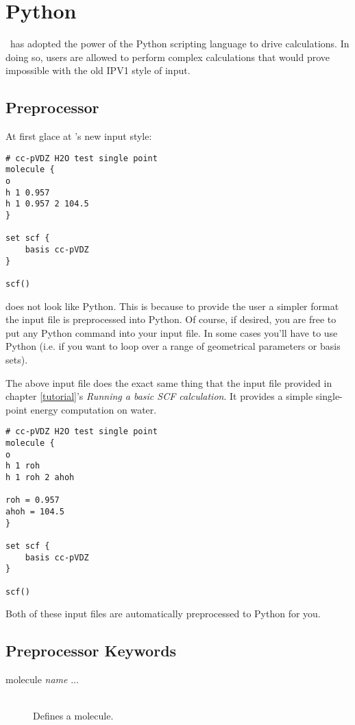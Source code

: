 \section{Python} \label{python}
\PSIfour\ has adopted the power of the Python scripting language
to drive calculations. In doing so, users are allowed to perform
complex calculations that would prove impossible with the old
IPV1 style of input.

\subsection{Preprocessor}
At first glace at \PSIfour 's new input style:
\begin{verbatim}
# cc-pVDZ H2O test single point
molecule {
o
h 1 0.957
h 1 0.957 2 104.5
}

set scf {
    basis cc-pVDZ
}

scf()
\end{verbatim}
does not look like Python. This is because to provide the user a simpler
format the input file is preprocessed into Python. Of course, if desired,
you are free to put any Python command into your input file. In some
cases you'll have to use Python (i.e. if you want to loop over a range of
geometrical parameters or basis sets).

The above input file does the exact same thing that the input file provided
in chapter \ref{tutorial}'s {\em Running a basic SCF calculation}. It provides
a simple single-point energy computation on water.

\begin{verbatim}
# cc-pVDZ H2O test single point
molecule {
o
h 1 roh
h 1 roh 2 ahoh

roh = 0.957
ahoh = 104.5
}

set scf {
    basis cc-pVDZ
}

scf()
\end{verbatim}

Both of these input files are automatically preprocessed to Python for you.

\subsection{Preprocessor Keywords}

\begin{description}
\item[molecule {\em name } { ... }]\mbox{}\\
Defines a molecule.

\end{description}
